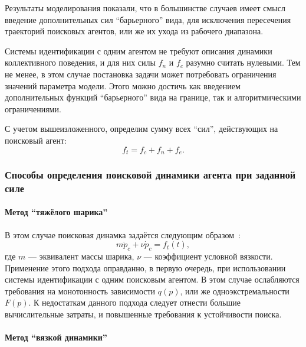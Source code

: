 Результаты моделирования показали, что в большинстве случаев
имеет смысл введение дополнительных сил ``барьерного'' вида,
для исключения пересечения траекторий поисковых агентов,
или же их ухода из рабочего диапазона.

Системы идентификации с одним агентом не требуют описания
динамики коллективного поведения, и для
них силы $f_n$ и $f_c$ разумно считать нулевыми.
Тем не менее, в этом случае постановка задачи может потребовать
ограничения значений параметра модели. Этого можно достичь
как введением дополнительных функций ``барьерного''
вида на границе, так и алгоритмическими ограничениями.


С учетом вышеизложенного, определим
сумму всех ``сил'', действующих на поисковый агент:
\begin{equation}
  f_t = f_c + f_n + f_e .
  \label{atu:eq:f_t}
\end{equation}





\subsubsection{Способы определения поисковой динамики агента при заданной силе}  %

\paragraph{Метод ``тяжёлого шарика''}

В этом случае поисковая динамка задаётся следующим образом~:
%
\begin{equation}
  m \ddot{p}_c + \nu \dot{p}_c = f_t(t),
  \label{atu:eq:heavy_ball}
\end{equation}
%
где $m$ --- эквивалент массы шарика,
$\nu$ --- коэффициент условной вязкости.
Применение этого подхода оправданно,
в первую очередь, при использовании системы идентификации с одним поисковым агентом.
В этом случае ослабляются требования на монотонность зависимости $q(p)$,
или же одноэкстремальности $F(p)$.
К недостаткам данного подхода следует отнести
большие вычислительные затраты,
и повышенные требования к устойчивости поиска.


\paragraph{Метод ``вязкой динамики''}

